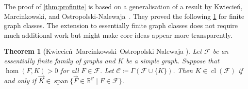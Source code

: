 \documentclass[3p,final]{elsarticle}
\DeclareMathOperator{\spn}{span}
\DeclareMathOperator{\cl}{cl}
\newtheorem{theorem}{Theorem}
\begin{document}
	The proof of \cref{thm:profinite} is based on a generalisation of a result by Kwiecie{\'n}, Marcinkowski, and Ostropolski-Nalewaja~\cite{kwiecien_determinacy_2022}.
	They proved the following \cref{thm:kwiecien22} for finite graph classes.
	The extension to essentially finite graph classes does not require much additional work but might make core ideas appear more transparently.
	
	
	\begin{theorem}[Kwiecie{\'n}--Marcinkowski--Ostropolski-Nalewaja \cite{kwiecien_determinacy_2022}] \label{thm:kwiecien22}
		Let $\mathcal{F}$ be an essentially finite family of graphs and $K$ be a simple graph. 
		Suppose that $\hom(F, K) > 0$ for all $F \in \mathcal{F}$.
		Let $\mathcal{C} \coloneqq \Gamma(\mathcal{F} \cup \{K\})$.
		Then $K \in \cl(\mathcal{F})$ if and only if $\vec{K} \in \spn \{\vec{F} \in \mathbb{R}^{\mathcal{C}} \mid F \in \mathcal{F}\}$.
	\end{theorem}
\end{document}
